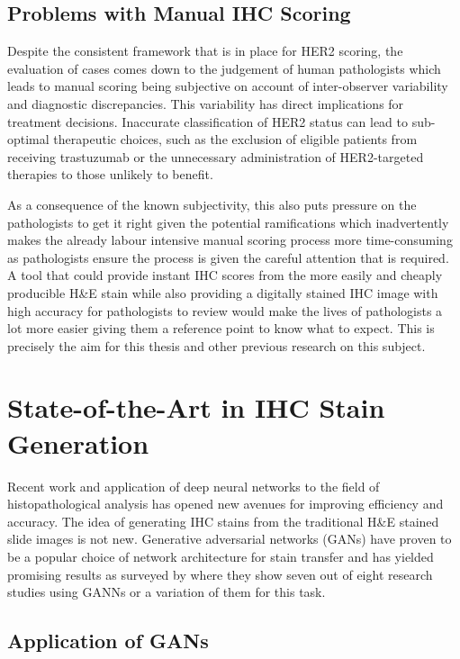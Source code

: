 \vspace{5mm}

\subsection{{Problems with Manual IHC Scoring}}

Despite the consistent framework that is in place for HER2 scoring, the evaluation of cases comes down to the judgement of human pathologists which leads to manual scoring being subjective on account of inter-observer variability and diagnostic discrepancies. This variability has direct implications for treatment decisions. Inaccurate classification of HER2 status can lead to sub-optimal therapeutic choices, such as the exclusion of eligible patients from receiving trastuzumab or the unnecessary administration of HER2-targeted therapies to those unlikely to benefit.

As a consequence of the known subjectivity, this also puts pressure on the pathologists to get it right given the potential ramifications which inadvertently makes the already labour intensive manual scoring process more time-consuming as pathologists ensure the process is given the careful attention that is required. A tool that could provide instant IHC scores from the more easily and cheaply producible H\&E stain while also providing a digitally stained IHC image with high accuracy for pathologists to review would make the lives of pathologists a lot more easier giving them a reference point to know what to expect. This is precisely the aim for this thesis and other previous research on this subject.

\section{State-of-the-Art in IHC Stain Generation}

Recent work and application of deep neural networks to the field of histopathological analysis has opened new avenues for improving efficiency and accuracy. The idea of generating IHC stains from the traditional H\&E stained slide images is not new. Generative adversarial networks (GANs) have proven to be a popular choice of network architecture for stain transfer and has yielded promising results as surveyed by \textcite{Srinidhi2021DeepSurvey} where they show seven out of eight research studies using GANNs or a variation of them for this task.

\subsection{Application of GANs}

